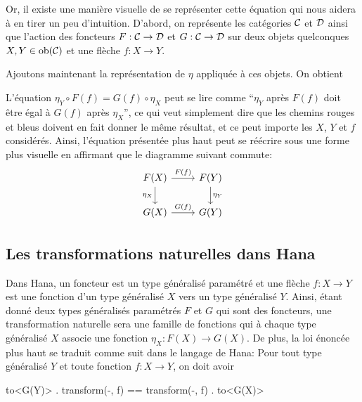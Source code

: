 Or, il existe une manière visuelle de se représenter cette équation qui nous
aidera à en tirer un peu d'intuition. D'abord, on représente les catégories
$\mathcal{C}$ et $\mathcal{D}$ ainsi que l'action des foncteurs $F : \mathcal{C} \to \mathcal{D}$ et $G : \mathcal{C} \to \mathcal{D}$
sur deux objets quelconques $X,Y \in \mathrm{ob}(\mathcal{C})$ et une flèche $f : X \to Y$.


Ajoutons maintenant la représentation de $\eta$ appliquée à ces objets. On
obtient


L'équation $\eta_Y \circ F(f) = G(f) \circ \eta_X$ peut se lire comme
``$\eta_Y$ après $F(f)$ doit être égal à $G(f)$ après $\eta_X$'', ce
qui veut simplement dire que les chemins rouges et bleus doivent en fait
donner le même résultat, et ce peut importe les $X$, $Y$ et $f$ considérés.
Ainsi, l'équation présentée plus haut peut se réécrire sous une forme plus
visuelle en affirmant que le diagramme suivant commute:
\[
\begin{tikzcd}
    F(X) \arrow[d, "\eta_X"'] \arrow[r, "F(f)"] & F(Y) \arrow[d, "\eta_Y"] \\
    G(X) \arrow[r, "G(f)"] & G(Y)
\end{tikzcd}
\]

\subsection{Les transformations naturelles dans Hana}
Dans Hana, un foncteur est un type généralisé paramétré et une flèche
$f : X \to Y$ est une fonction d'un type généralisé $X$ vers un type
généralisé $Y$. Ainsi, étant donné deux types généralisés paramétrés $F$
et $G$ qui sont des foncteurs, une transformation naturelle sera une
famille de fonctions qui à chaque type généralisé $X$ associe une fonction
$\eta_X : F(X) \to G(X)$. De plus, la loi énoncée plus haut se traduit comme
suit dans le langage de Hana: Pour tout type généralisé $Y$ et toute fonction
$f : X \to Y$, on doit avoir
\begin{cpp}
    to<G(Y)> . transform(-, f) == transform(-, f) . to<G(X)>
\end{cpp}

